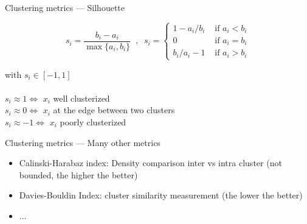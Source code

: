\begin{frame}{Clustering metrics --- Silhouette}
  
  \begin{center}
    \[
    s_i = \frac{b_i - a_i}{\max\{a_i, b_i\}}\;\;,\;\;
    s_i = \left\{
    \begin{array}{ll}
      1 - a_i/b_i & \mbox{ if } a_i < b_i \\[2mm]
      0 & \mbox{ if } a_i = b_i \\[2mm]
      b_i / a_i - 1 & \mbox{ if } a_i > b_i
    \end{array}\right.
    \]
    
  \end{center}
  with $s_i \in [-1, 1]$ \\
  \\
  $s_i \approx 1 \iff$ $x_i$ well clusterized \\
  $s_i \approx 0 \iff$ $x_i$ at the edge between two clusters\\
  $s_i \approx -1 \iff$ $x_i$ poorly clusterized
\end{frame}

\begin{frame}{Clustering metrics --- Many other metrics}
  \begin{itemize}
  \item Calinski-Harabaz index: Density comparison inter vs intra cluster (not bounded, the higher the better)
  \item Davies-Bouldin Index: cluster similarity measurement (the lower the better)
  \item ...
  \end{itemize}
\end{frame}
